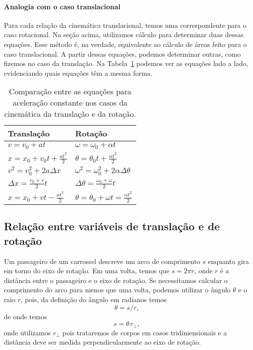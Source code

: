 \paragraph{Analogia com o caso translacional}

Para cada relação da cinemática translacional, temos uma correspondente para o caso rotacional. Na seção acima, utilizamos cálculo para determinar duas dessas equações. Esse método é, na verdade, equivalente ao cálculo de áreas feito para o caso translacional. A partir dessas equações, podemos determinar outras, como fizemos no caso da translação. Na Tabela~\ref{Tab:CompEqsTransRot} podemos ver as equações lado a lado, evidenciando quais equações têm a mesma forma.

\begin{table}[!h]
\centering
\caption{Comparação entre as equações para aceleração constante nos casos da cinemática da translação e da rotação.\label{Tab:CompEqsTransRot}}
\begin{tabular}{ll}
\toprule
Translação & Rotação \\
\midrule
$v = v_0 + at$ & $\omega = \omega_0 + \alpha t$ \\
$x = x_0 + v_0 t +\frac{at^2}{2}$ & $\theta = \theta_0 t + \frac{\alpha t^2}{2}$ \\
$v^2 = v_0^2 + 2 a \Delta x$ & $\omega^2 = \omega_0^2 + 2\alpha \Delta\theta$ \\
$\Delta x = \frac{v_0 + v}{2} t$ & $\Delta\theta = \frac{\omega_0 + \omega}{2} t$ \\
$x = x_0 + vt - \frac{at^2}{2}$ & $\theta = \theta_0 + \omega t = \frac{\alpha t^2}{2}$ \\
\bottomrule
\end{tabular}
\end{table}

\subsection{Relação entre variáveis de translação e de rotação}

Um passageiro de um carrossel descreve um arco de comprimento $s$ enquanto gira em torno do eixo de rotação. Em uma volta, temos que $s = 2\pi r$, onde $r$ é a distância entre o passageiro e o eixo de rotação. Se necessitamos calcular o comprimento do arco para menos que uma volta, podemos utilizar o ângulo $\theta$ e o raio $r$, pois, da definição do ângulo em radianos temos
\begin{equation}
	\theta = s/r,
\end{equation}
%
de onde temos
\begin{equation}
	s = \theta \,r_\perp,
\end{equation}
%
onde utilizamos $r_\perp$ pois trataremos de corpos em casos tridimensionais e a distância deve ser medida perpendicularmente ao eixo de rotação.

